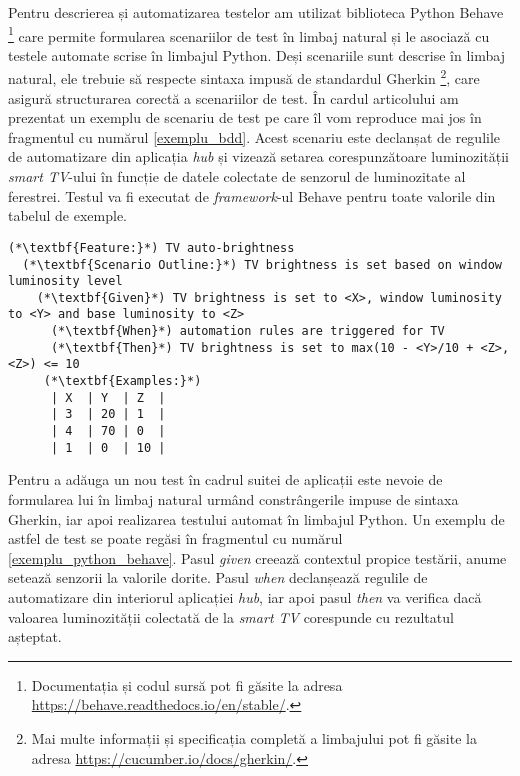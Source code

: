 Pentru descrierea și automatizarea testelor am utilizat biblioteca Python Behave \footnote{Documentația și codul sursă pot fi găsite la adresa \url{https://behave.readthedocs.io/en/stable/}.} care permite formularea scenariilor de test în limbaj natural și le asociază cu testele automate scrise în limbajul Python. Deși scenariile sunt descrise în limbaj natural, ele trebuie să respecte sintaxa impusă de standardul Gherkin \footnote{Mai multe informații și specificația completă a limbajului pot fi găsite la adresa \url{https://cucumber.io/docs/gherkin/}.}, care asigură structurarea corectă a scenariilor de test. În cardul articolului am prezentat un exemplu de scenariu de test pe care îl vom reproduce mai jos în fragmentul cu numărul \ref{exemplu_bdd}. Acest scenariu este declanșat de regulile de automatizare din aplicația \textit{hub} și vizează setarea corespunzătoare luminozității \textit{smart TV}-ului în funcție de datele colectate de senzorul de luminozitate al ferestrei. Testul va fi executat de \textit{framework}-ul Behave pentru toate valorile din tabelul de exemple.

\begin{lstlisting}[caption={Exemplu de scenariu de test BDD pentru aplicațiile din suită}, label={exemplu_bdd}]
(*\textbf{Feature:}*) TV auto-brightness
  (*\textbf{Scenario Outline:}*) TV brightness is set based on window luminosity level
    (*\textbf{Given}*) TV brightness is set to <X>, window luminosity to <Y> and base luminosity to <Z>
      (*\textbf{When}*) automation rules are triggered for TV
      (*\textbf{Then}*) TV brightness is set to max(10 - <Y>/10 + <Z>, <Z>) <= 10
     (*\textbf{Examples:}*)
      | X  | Y  | Z  |
      | 3  | 20 | 1  |
      | 4  | 70 | 0  |
      | 1  | 0  | 10 |
\end{lstlisting}

Pentru a adăuga un nou test în cadrul suitei de aplicații este nevoie de formularea lui în limbaj natural urmând constrângerile impuse de sintaxa Gherkin, iar apoi realizarea testului automat în limbajul Python. Un exemplu de astfel de test se poate regăsi în fragmentul cu numărul \ref{exemplu_python_behave}. Pasul \textit{given} creează contextul propice testării, anume setează senzorii la valorile dorite. Pasul \textit{when} declanșează regulile de automatizare din interiorul aplicației \textit{hub}, iar apoi pasul \textit{then} va verifica dacă valoarea luminozității colectată de la \textit{smart TV} corespunde cu rezultatul așteptat.

